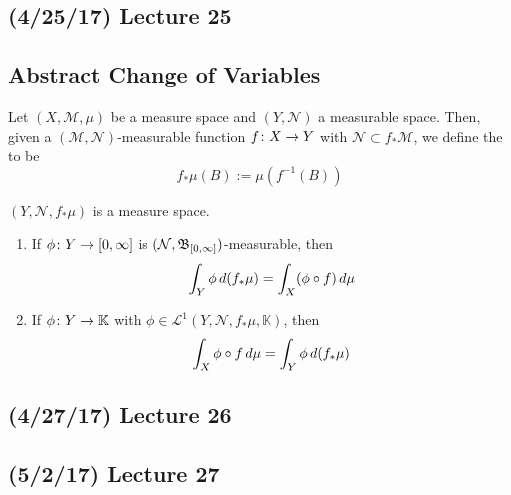 \documentclass[11pt,leqno,oneside]{amsbook}
\numberwithin{thm}{section}
\newcommand{\M}{\mathcal{M}} %
\newcommand{\cL}{\mathcal{L}}
\newcommand{\cN}{\mathcal{N}}
\newcommand{\K}{\mathbb{K}} %
\begin{document}
\subsection*{(4/25/17) Lecture 25}
\subsection{Abstract Change of Variables}
\begin{defn}
  Let \((X,\M,\mu)\) be a measure space and \((Y,\cN)\) a measurable
  space. Then, given a \((\M,\cN)\)-measurable function \(f \colon X
  \to Y\) with \(\cN \subset f_* \M\), we define the  to be \[
    f_* \mu(B) := \mu(f^{-1}(B))
  \]
\end{defn}
\begin{prop}
  \((Y,\cN,f_*\mu)\) is a measure space.
\end{prop}
\begin{thm} \mbox{}
  \begin{enumerate}
  \item If \(\phi \colon Y \to [0,\infty]\) is
    \((\cN,\B_{[0,\infty]})\)-measurable, then \[
      \int_Y \phi \, d(f_*\mu) = \int_X(\phi \circ f) \, d\mu
    \]
  \item If \(\phi \from Y \to \K\) with \(\phi \in \cL^1(Y,\cN,
    f_*\mu,\K)\), then \[
      \int_X \phi\circ f \, d\mu = \int_Y \phi \, d(f_*\mu)
    \]
  \end{enumerate}
\end{thm}
\subsection*{(4/27/17) Lecture 26}
\subsection*{(5/2/17) Lecture 27}
\end{document}
